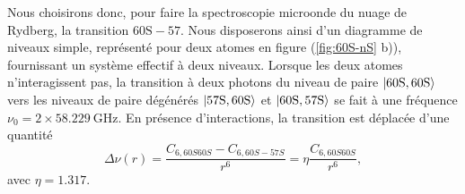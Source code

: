 Nous choisirons donc, pour faire la spectroscopie microonde du nuage de Rydberg, la transition $\mathrm{60S-57}$.
Nous disposerons ainsi d'un diagramme de niveaux simple, représenté pour deux atomes en figure (\ref{fig:60S-nS} b)), fournissant un système effectif à deux niveaux.
Lorsque les deux atomes n'interagissent pas, la transition à deux photons du niveau de paire $\ket{\mathrm{60S,60S}}$ vers les niveaux de paire dégénérés $\ket{\mathrm{57S,60S}}$ et $\ket{\mathrm{60S,57S}}$ se fait à une fréquence $\nu_0 = 2\times \SI{58.229}{\GHz}$.
En présence d'interactions, la transition est déplacée d'une quantité
\begin{equation}
\label{eq:60s-57s_2atoms}
\Delta\nu (r) = \frac{C_{6,60S60S}-C_{6,60S-57S}}{r^6} = \eta \frac{C_{6,60S60S}}{r^6},
\end{equation}
avec $\eta = \num{1.317}$.

